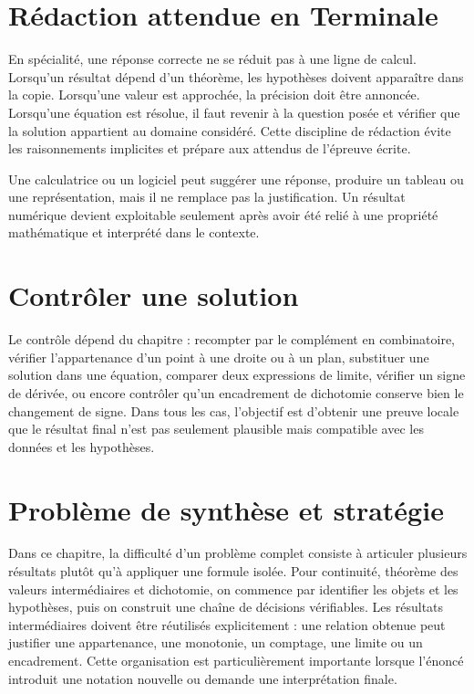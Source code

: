 \section{Rédaction attendue en Terminale}
En spécialité, une réponse correcte ne se réduit pas à une ligne de calcul. Lorsqu'un résultat dépend d'un théorème, les hypothèses doivent apparaître dans la copie. Lorsqu'une valeur est approchée, la précision doit être annoncée. Lorsqu'une équation est résolue, il faut revenir à la question posée et vérifier que la solution appartient au domaine considéré. Cette discipline de rédaction évite les raisonnements implicites et prépare aux attendus de l'épreuve écrite.

\begin{attention}
Une calculatrice ou un logiciel peut suggérer une réponse, produire un tableau ou une représentation, mais il ne remplace pas la justification. Un résultat numérique devient exploitable seulement après avoir été relié à une propriété mathématique et interprété dans le contexte.
\end{attention}

\section{Contrôler une solution}
Le contrôle dépend du chapitre : recompter par le complément en combinatoire, vérifier l'appartenance d'un point à une droite ou à un plan, substituer une solution dans une équation, comparer deux expressions de limite, vérifier un signe de dérivée, ou encore contrôler qu'un encadrement de dichotomie conserve bien le changement de signe. Dans tous les cas, l'objectif est d'obtenir une preuve locale que le résultat final n'est pas seulement plausible mais compatible avec les données et les hypothèses.

\section{Problème de synthèse et stratégie}

Dans ce chapitre, la difficulté d'un problème complet consiste à articuler plusieurs résultats plutôt qu'à appliquer une formule isolée. Pour continuité, théorème des valeurs intermédiaires et dichotomie, on commence par identifier les objets et les hypothèses, puis on construit une chaîne de décisions vérifiables. Les résultats intermédiaires doivent être réutilisés explicitement : une relation obtenue peut justifier une appartenance, une monotonie, un comptage, une limite ou un encadrement. Cette organisation est particulièrement importante lorsque l'énoncé introduit une notation nouvelle ou demande une interprétation finale.


